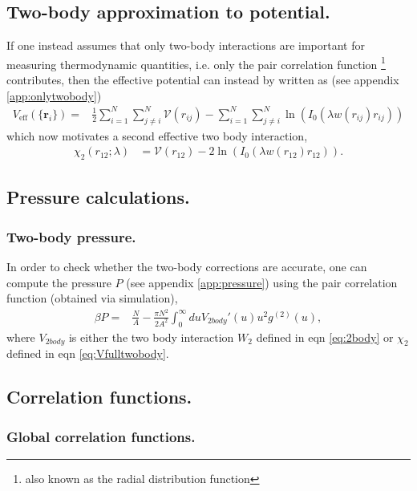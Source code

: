 \documentclass[twocolumn,amsmath,amssymb,aps]{revtex4-1}%
\begin{document}
\subsection{Two-body approximation to potential.}
If one instead assumes that only two-body interactions are important for
measuring thermodynamic quantities, i.e. only the pair correlation function
\footnote{also known as the radial distribution function} contributes, then
the effective potential can instead by written as (see appendix
\ref{app:onlytwobody})
\begin{align}
  V_{\mathrm{eff}}(\{\bm{r}_i\})
  =&\frac{1}{2}\sum_{i=1}^N\sum_{j\neq i}^N\mathcal{V}(r_{ij})
  -\sum_{i=1}^N\sum_{j\neq i}^N\ln(I_0(\lambda w(r_{ij})r_{ij}))
\end{align}
which now motivates a second effective two body interaction,
\begin{align}\label{eq:Vfulltwobody}
  \chi_2(r_{12};\lambda)
  &= \mathcal{V}(r_{12})-2\ln(I_0(\lambda w(r_{12})r_{12})).
\end{align}

\subsection{Pressure calculations.}

\subsubsection{Two-body pressure.}
In order to check whether the two-body corrections are accurate, one can
compute the pressure $P$ (see appendix \ref{app:pressure}) using the pair
correlation function (obtained via simulation), 
\begin{align}
  \beta P
  =& \frac{N}{A}
  -\frac{\pi N^2}{2A^2}
  \int_0^{\infty} du V_{2body}'(u)u^2 g^{(2)}(u),
\end{align}
where $V_{2body}$ is either the two body interaction $W_2$ defined in
eqn \ref{eq:2body} or $\chi_2$ defined in eqn \ref{eq:Vfulltwobody}.

\subsection{Correlation functions.}

\subsubsection{Global correlation functions.}
\end{document}
